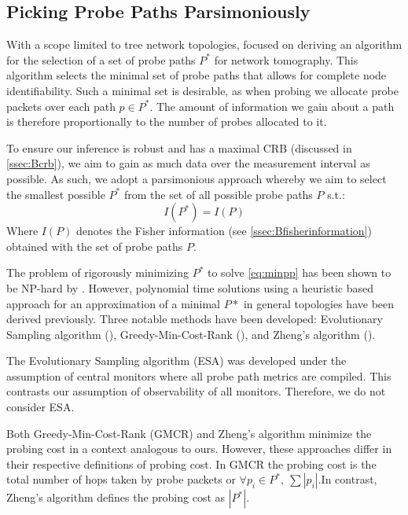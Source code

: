 \subsection{Picking Probe Paths Parsimoniously}
\label{ssec:Bparsppselection}
With a scope limited to tree network topologies, \cite{lawrence_network_2006} focused on deriving an algorithm for the selection of a set of probe paths $P^*$ for network tomography. This algorithm selects the minimal set of probe paths that allows for complete node identifiability. Such a minimal set is desirable, as when probing we allocate probe packets over each path $p\in P^*$. The amount of information we gain about a path is therefore proportionally to the number of probes allocated to it.\par
To ensure our inference is robust and has a maximal CRB (discussed in \cref{ssec:Bcrb}), we aim to gain as much data over the measurement interval as possible. As such, we adopt a parsimonious approach whereby we aim to select the smallest possible $P^*$ from the set of all possible probe paths $P$ s.t.:
\begin{equation*}
\label{eq:minpp}
    I(P^*) = I(P)
\end{equation*}
Where $I(P)$ denotes the Fisher information (see \cref{ssec:Bfisherinformation}) obtained with the set of probe paths $P$.\par
The problem of rigorously minimizing $P^*$ to solve \cref{eq:minpp} has been shown to be NP-hard by \cite{zheng_minimizing_2013}. However, polynomial time solutions using a heuristic based approach for an approximation of a minimal $P*$ in general topologies have been derived previously. Three notable methods have been developed: Evolutionary Sampling algorithm (\cite{rahali_unicast_2019}), Greedy-Min-Cost-Rank (\cite{tootaghaj_parsimonious_2018}), and Zheng's algorithm (\cite{zheng_minimizing_2013}).\par
The Evolutionary Sampling algorithm (ESA) was developed under the assumption of central monitors where all probe path metrics are compiled. This contrasts our assumption of observability of all monitors. Therefore, we do not consider ESA.\par
Both Greedy-Min-Cost-Rank (GMCR) and Zheng's algorithm minimize the probing cost in a context analogous to ours. However, these approaches differ in their respective definitions of probing cost. In GMCR the probing cost is the total number of hops taken by probe packets or $\forall p_i\in P^*,\ \sum |p_i|$.In contrast, Zheng's algorithm defines the probing cost as $|P^*|$.\par
